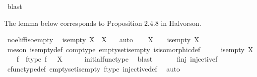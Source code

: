 \begin{isabellebody}
\ blast%
\endisatagproof
{\isafoldproof}%
%
\isadelimproof
%
\endisadelimproof
%
\begin{isamarkuptext}%
The lemma below corresponds to Proposition 2.4.8 in Halvorson.%
\end{isamarkuptext}\isamarkuptrue%
\isamarkupfalse%
\ no{\isacharunderscore}{\kern0pt}el{\isacharunderscore}{\kern0pt}iff{\isacharunderscore}{\kern0pt}iso{\isacharunderscore}{\kern0pt}empty{\isacharcolon}{\kern0pt}\isanewline
\ \ {\isachardoublequoteopen}is{\isacharunderscore}{\kern0pt}empty\ X\ {\isasymlongleftrightarrow}\ X\ {\isasymcong}\ {\isasymemptyset}{\isachardoublequoteclose}\isanewline
%
\isadelimproof
%
\endisadelimproof
%
\isatagproof
{}\isamarkupfalse%
\ auto\isanewline
\ \ \isamarkupfalse%
\ {\isachardoublequoteopen}X\ {\isasymcong}\ {\isasymemptyset}\ {\isasymLongrightarrow}\ is{\isacharunderscore}{\kern0pt}empty\ X{\isachardoublequoteclose}\isanewline
\ \ \ \ \isamarkupfalse%
\ {\isacharparenleft}{\kern0pt}meson\ is{\isacharunderscore}{\kern0pt}empty{\isacharunderscore}{\kern0pt}def\ comp{\isacharunderscore}{\kern0pt}type\ emptyset{\isacharunderscore}{\kern0pt}is{\isacharunderscore}{\kern0pt}empty\ is{\isacharunderscore}{\kern0pt}isomorphic{\isacharunderscore}{\kern0pt}def{\isacharparenright}{\kern0pt}\isanewline
{}\isamarkupfalse%
\ \isanewline
\ \ \isamarkupfalse%
\ {\isachardoublequoteopen}is{\isacharunderscore}{\kern0pt}empty\ X{\isachardoublequoteclose}\isanewline
\ \ \isamarkupfalse%
\ f\ \ f{\isacharunderscore}{\kern0pt}type{\isacharcolon}{\kern0pt}\ {\isachardoublequoteopen}f{\isacharcolon}{\kern0pt}\ {\isasymemptyset}\ {\isasymrightarrow}\ X{\isachardoublequoteclose}\isanewline
\ \ \ \ \isamarkupfalse%
\ initial{\isacharunderscore}{\kern0pt}func{\isacharunderscore}{\kern0pt}type\ \isamarkupfalse%
\ blast\isanewline
\ \isanewline
\ \ \isamarkupfalse%
\ \ f{\isacharunderscore}{\kern0pt}inj{\isacharcolon}{\kern0pt}\ {\isachardoublequoteopen}injective{\isacharparenleft}{\kern0pt}f{\isacharparenright}{\kern0pt}{\isachardoublequoteclose}\isanewline
\ \ \ \ \isamarkupfalse%
\ cfunc{\isacharunderscore}{\kern0pt}type{\isacharunderscore}{\kern0pt}def\ emptyset{\isacharunderscore}{\kern0pt}is{\isacharunderscore}{\kern0pt}empty\ f{\isacharunderscore}{\kern0pt}type\ injective{\isacharunderscore}{\kern0pt}def\ \isamarkupfalse%
\ auto\isanewline
\ \ \isamarkupfalse%
\ \isamarkupfalse%

\end{isabellebody}
